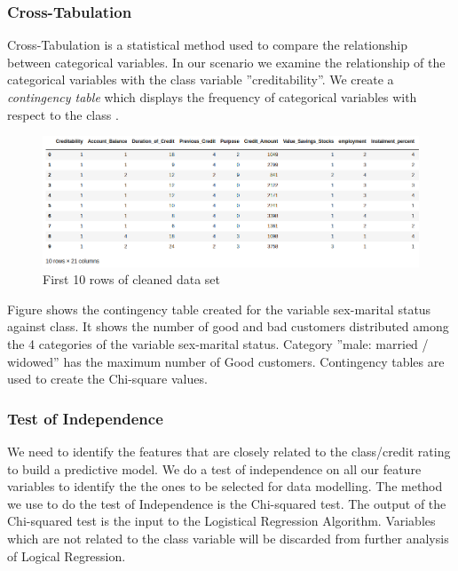 \documentclass[sigconf]{acmart}
\begin{document}
\subsubsection{Cross-Tabulation}

Cross-Tabulation is a statistical method used to compare the relationship between categorical variables. In our scenario we examine the relationship of the categorical variables with the class variable ''creditability''. We create a \emph{contingency table} which displays the frequency of categorical variables with respect to the class \cite{cross-tabulation}. 

\begin{figure}[htb]
  \centering
  \includegraphics[width=1.0\columnwidth]{project/images/Figure3.png}
  \caption{First 10 rows of cleaned data set
  \cite{psu-site}}
  \label{fig:Figure3} 
\end{figure}

Figure shows the contingency table created for the variable sex-marital status against class. It shows the number of good and bad customers distributed among the 4 categories of the variable sex-marital status. Category ''male: married / widowed'' has the maximum number of Good customers. Contingency tables are used to create the Chi-square values.

\subsubsection{Test of Independence}

We need to identify the features that are closely related to the class/credit rating to build a predictive model. We do a test of independence on all our feature variables to identify the the ones to be selected for data modelling. The method we use to do the test of Independence is the Chi-squared test. The output of the Chi-squared test is the input to the Logistical Regression Algorithm. Variables which are not related to the class variable will be discarded from further analysis of Logical Regression. 
\end{document}
